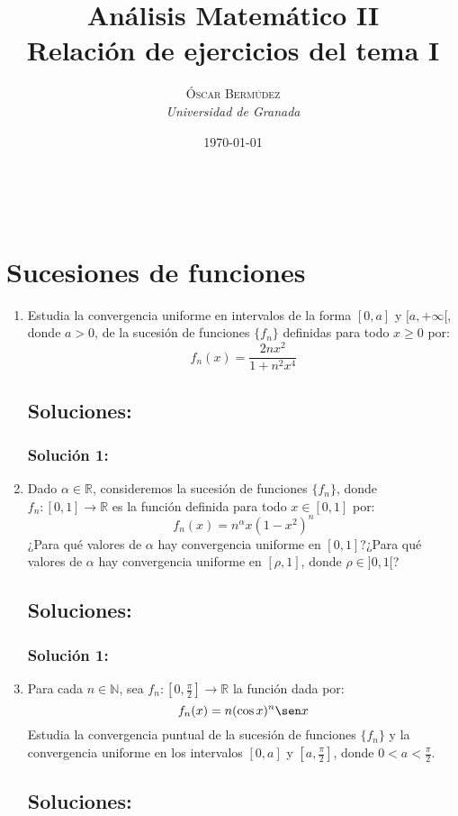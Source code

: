 \documentclass[a4paper, 11pt]{article} %
\title{\textbf{Análisis Matemático II}\\ %
Relación de ejercicios del tema I} %
\author{\textsc{Óscar Bermúdez} %
\\{\textit{Universidad de Granada}}} %
\date{\today} %
\makeatletter
\renewcommand{\maketitle}{ %
\begin{center} %
{\LARGE\@title} %
\end{center}
\vspace{50pt} %
\begin{flushright}
{\large\@author} %
\\\@date %

\vspace{40pt} %
\end{flushright}
}
\makeatother
\begin{document}
\maketitle %

\section*{Sucesiones de funciones}
\begin{enumerate}
	\item Estudia la convergencia uniforme en intervalos de la forma $[0,a]$ y $[a, +\infty[$,
	donde $a > 0$, de la sucesión de funciones $\{f_n\}$ definidas para todo $x \geq 0$ por:
	$$f_n(x) = \frac{2nx^2}{1+n^2x^4}$$
	\subsection*{Soluciones:}
		\subsubsection*{Solución 1:}
	
	\item Dado $\alpha \in \mathbb{R}$, consideremos la sucesión de funciones $\{f_n\}$, donde\\ %
	$f_n: [0,1] \rightarrow \mathbb{R}$ es la función definida para todo $x \in [0,1]$ por:
	$$f_n(x) = n^\alpha x(1-x^2)^n$$
	¿Para qué valores de $\alpha$ hay convergencia uniforme en $[0,1]$?¿Para qué valores de
	$\alpha$ hay convergencia uniforme en $[\rho,1]$, donde $\rho \in ]0,1[$?
	\subsection*{Soluciones:}
		\subsubsection*{Solución 1:}
			
	\item Para cada $n \in \mathbb{N}$, sea $f_n: \left[0, \frac{\pi}{2}\right] \rightarrow \mathbb{R}$
	la función dada por:
	$$f_n(x) = n(\cos x)^n \sen x$$
	Estudia la convergencia puntual de la sucesión de funciones $\{f_n\}$ y la convergencia
	uniforme en los intervalos $[0, a]$ y $\left[a,\frac{\pi}{2}\right]$, donde $0 < a < \frac{\pi}{2}$.
	\subsection*{Soluciones:}

\end{enumerate}
\end{document}
